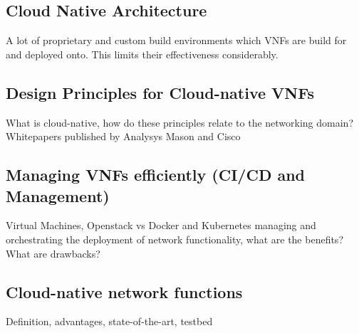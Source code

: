\subsection{Cloud Native Architecture}
A lot of proprietary and custom build environments which VNFs are build for and deployed onto. This limits their effectiveness considerably.
\subsection{Design Principles for Cloud-native VNFs }
What is cloud-native, how do these principles relate to  the networking domain? Whitepapers published by Analysys Mason \cite{evolutionnfv} and Cisco \cite{CNF}
\subsection{Managing VNFs efficiently (CI/CD and Management)}
Virtual Machines, Openstack vs Docker and Kubernetes managing and orchestrating the deployment of network functionality, what are the benefits? What are drawbacks?
\subsection{Cloud-native network functions}
Definition, advantages, state-of-the-art, testbed 




